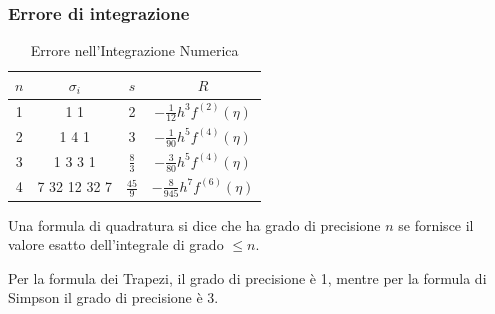 \documentclass{article}
\begin{document}
\subsubsection{Errore di integrazione}
\begin{table}[h]
\centering
\caption{Errore nell'Integrazione Numerica}
\begin{tabular}{|c|c|c|c|}
\hline
\( n \) & \( \sigma_i \) & \( s \) & \( R \) \\
\hline
1 & 1 1 & 2 & \(-\frac{1}{12} h^3 f^{(2)}(\eta)\) \\
\hline
2 & 1 4 1 & 3 & \(-\frac{1}{90} h^5 f^{(4)}(\eta)\) \\
\hline
3 & 1 3 3 1 & $\frac{8}{3}$ & $-\frac{3}{80}h^5f^{(4)}(\eta)$ \\
\hline
4 & 7 32 12 32 7 & $\frac{45}{9}$ & $-\frac{8}{945}h^7f^{(6)}(\eta)$ \\
\hline
\end{tabular}
\end{table}
\begin{definition} 
    Una formula di quadratura si dice che ha grado di precisione $n$ se
    fornisce il valore esatto dell'integrale di grado $\leq n$.
\end{definition}
Per la formula dei Trapezi, il grado di precisione è 1, mentre per la formula
di Simpson il grado di precisione è 3.
\end{document}
